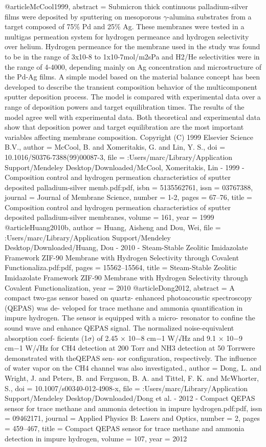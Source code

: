 @article{McCool1999,
abstract = {Submicron thick continuous palladium-silver films were deposited by sputtering on mesoporous $\gamma$-alumina substrates from a target composed of 75{\%} Pd and 25{\%} Ag. These membranes were tested in a multigas permeation system for hydrogen permeance and hydrogen selectivity over helium. Hydrogen permeance for the membrane used in the study was found to be in the range of 3x10-8 to 1x10-7mol/m2sPa and H2/He selectivities were in the range of 4-4000, depending mainly on Ag concentration and microstructure of the Pd-Ag films. A simple model based on the material balance concept has been developed to describe the transient composition behavior of the multicomponent sputter deposition process. The model is compared with experimental data over a range of deposition powers and target equilibration times. The results of the model agree well with experimental data. Both theoretical and experimental data show that deposition power and target equilibration are the most important variables affecting membrane composition. Copyright (C) 1999 Elsevier Science B.V.},
author = {McCool, B. and Xomeritakis, G. and Lin, Y. S.},
doi = {10.1016/S0376-7388(99)00087-3},
file = {:Users/marc/Library/Application Support/Mendeley Desktop/Downloaded/McCool, Xomeritakis, Lin - 1999 - Composition control and hydrogen permeation characteristics of sputter deposited palladium-silver memb.pdf:pdf},
isbn = {5135562761},
issn = {03767388},
journal = {Journal of Membrane Science},
number = {1-2},
pages = {67--76},
title = {{Composition control and hydrogen permeation characteristics of sputter deposited palladium-silver membranes}},
volume = {161},
year = {1999}
}
@article{Huang2010b,
author = {Huang, Aisheng and Dou, Wei},
file = {:Users/marc/Library/Application Support/Mendeley Desktop/Downloaded/Huang, Dou - 2010 - Steam-Stable Zeolitic Imidazolate Framework ZIF-90 Membrane with Hydrogen Selectivity through Covalent Functionaliza.pdf:pdf},
pages = {15562--15564},
title = {{Steam-Stable Zeolitic Imidazolate Framework ZIF-90 Membrane with Hydrogen Selectivity through Covalent Functionalization}},
year = {2010}
}
@article{Dong2012,
abstract = {A compact two-gas sensor based on quartz- enhanced photoacoustic spectroscopy (QEPAS) was de- veloped for trace methane and ammonia quantification in impure hydrogen. The sensor is equipped with a micro- resonator to confine the sound wave and enhance QEPAS signal. The normalized noise-equivalent absorption coef- ficients (1$\sigma$) of 2.45 × 10−8 cm−1 W/√Hz and 9.1 × 10−9 cm−1 W/√Hz for CH4 detection at 200 Torr and NH3 detection at 50 Torrwere demonstrated with theQEPAS sen- sor configuration, respectively. The influence of water vapor on the CH4 channel was also investigated.},
author = {Dong, L. and Wright, J. and Peters, B. and Ferguson, B. A. and Tittel, F. K. and McWhorter, S.},
doi = {10.1007/s00340-012-4908-x},
file = {:Users/marc/Library/Application Support/Mendeley Desktop/Downloaded/Dong et al. - 2012 - Compact QEPAS sensor for trace methane and ammonia detection in impure hydrogen.pdf:pdf},
issn = {09462171},
journal = {Applied Physics B: Lasers and Optics},
number = {2},
pages = {459--467},
title = {{Compact QEPAS sensor for trace methane and ammonia detection in impure hydrogen}},
volume = {107},
year = {2012}
}

